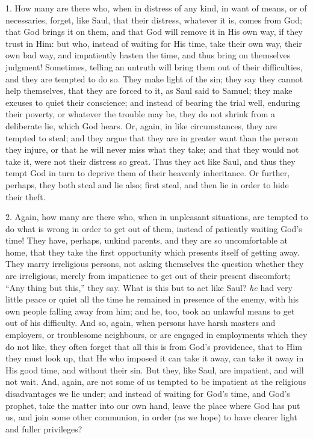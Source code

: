 1. How many are there who, when in distress of any kind, in want of
means, or of necessaries, forget, like Saul, that their distress,
whatever it is, comes from God; that God brings it on them, and that
God will remove it in His own way, if they trust in Him: but who,
instead of waiting for His time, take their own way, their own bad
way, and impatiently hasten the time, and thus bring on themselves
judgment! Sometimes, telling an untruth will bring them out of their
difficulties, and they are tempted to do so. They make light of the
sin; they say they cannot help themselves, that they are forced to it,
as Saul said to Samuel; they make excuses to quiet their conscience;
and instead of bearing the trial well, enduring their poverty, or
whatever the trouble may be, they do not shrink from a deliberate lie,
which God hears. Or, again, in like circumstances, they are tempted to
steal; and they argue that they are in greater want than the person
they injure, or that he will never miss what they take; and that they
would not take it, were not their distress so great. Thus they act
like Saul, and thus they tempt God in turn to deprive them of their
heavenly inheritance. Or further, perhaps, they both steal and lie
also; first steal, and then lie in order to hide their theft.

2. Again, how many are there who, when in unpleasant situations,
are tempted to do what is wrong in order to get out of them, instead
of patiently waiting God's time! They have, perhaps, unkind parents,
and they are so uncomfortable at home, that they take the first
opportunity which presents itself of getting away. They marry
irreligious persons, not asking themselves the question whether they
are irreligious, merely from impatience to get out of their present
discomfort; ``Any thing but this,'' they say. What is this but
to act like Saul? \emph{he} had very little peace or quiet all the
time he remained in presence of the enemy, with his own people falling
away from him; and he, too, took an unlawful means to get out of his
difficulty. And so, again, when persons have harsh masters and
employers, or troublesome neighbours, or are engaged in employments
which they do not like, they often forget that all this is from God's
providence, that to Him they must look up, that He who imposed it can
take it away, can take it away in His good time, and without their
sin. But they, like Saul, are impatient, and will not wait. And,
again, are not some of us tempted to be impatient at the religious
disadvantages we lie under; and instead of waiting for God's time, and
God's prophet, take the matter into our own hand, leave the place
where God has put us, and join some other communion, in order (as we
hope) to have clearer light and fuller privileges?

